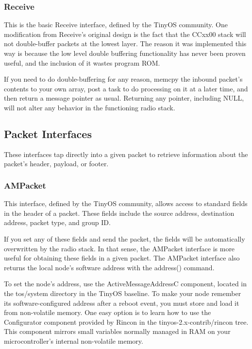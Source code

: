 \documentclass{article}
\begin{document}
\subsubsection{Receive}
This is the basic Receive interface, defined by the TinyOS community. One modification
from Receive's original design is the fact that the CCxx00 stack will not double-buffer packets
at the lowest layer. The reason it was implemented this way is because the low level
double buffering functionality has never been proven useful, and the inclusion of 
it wastes program ROM.

If you need to do double-buffering for any reason, memcpy the inbound packet's contents to
your own array, post a task to do processing on it at a later time, and then return a message 
pointer as usual. Returning any pointer, including NULL, will not alter any behavior in the 
functioning radio stack.

\subsection{Packet Interfaces}
These interfaces tap directly into a given packet to retrieve information about the packet's
header, payload, or footer. 

\subsubsection{AMPacket}
This interface, defined by the TinyOS community, allows access to standard fields in the
header of a packet. These fields include the source address, destination address, packet
type, and group ID. 

If you set any of these fields and send the packet, the fields will be automatically
overwritten by the radio stack. In that sense, the AMPacket interface is more useful for
obtaining these fields in a given packet.  The AMPacket interface also returns the local node's
software address with the address() command. 

To set the node's address, use the ActiveMessageAddressC component, located in the tos/system directory in the 
TinyOS baseline. To make your node remember its software-configured address after a reboot 
event, you must store and load it from non-volatile memory. One easy option is to learn how to use the 
Configurator component provided by Rincon in the tinyos-2.x-contrib/rincon tree. This 
component mirrors small variables normally managed in RAM on your microcontroller's 
internal non-volatile memory. 
\end{document}
